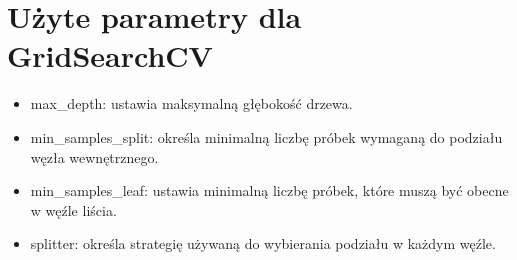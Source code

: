 {}
\section*{Użyte parametry dla GridSearchCV \cite{url_DecisionTreeRegressor, url_grid_search}}
\vspace{-1.0em}
\label{sec:ml_challenges}

\begin{itemize}
\setlength\itemsep{-0.5em}
\item max\_depth: ustawia maksymalną głębokość drzewa.
\item min\_samples\_split: określa minimalną liczbę próbek wymaganą do podziału węzła wewnętrznego.
\item min\_samples\_leaf: ustawia minimalną liczbę próbek, które muszą być obecne w węźle liścia.
\item splitter: określa strategię używaną do wybierania podziału w każdym węźle.
\end{itemize}

\noindent\makebox[\linewidth]{\rule{\paperwidth}{0.4pt}}